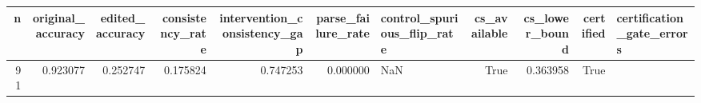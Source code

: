 \begin{tabular}{rrrrrrlrrrl}
\toprule
n & original_accuracy & edited_accuracy & consistency_rate & intervention_consistency_gap & parse_failure_rate & control_spurious_flip_rate & cs_available & cs_lower_bound & certified & certification_gate_errors \\
\midrule
91 & 0.923077 & 0.252747 & 0.175824 & 0.747253 & 0.000000 & NaN & True & 0.363958 & True &  \\
\bottomrule
\end{tabular}
